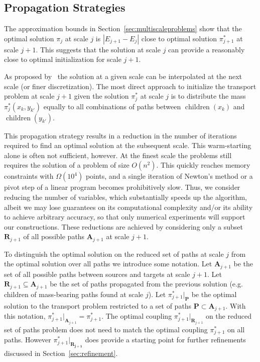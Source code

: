 \documentclass[twoside,11pt]{article}
\newcommand{\children}[0]{\operatorname{children}}
\newcommand{\coupling}[0]{\pi}
\begin{document}
\subsection{Propagation Strategies}
\label{sec:propagation}
The approximation bounds in Section~\ref{sec:multiscaleproblems} show that the
optimal solution $\coupling_{j}$ at scale $j$ is $| E_{j+1} - E_j |$ close to
optimal solution $\coupling_{j+1}^*$ at scale $j+1$. This suggests that the
solution at scale $j$ can provide a reasonably close to optimal initialization
for scale $j+1$.  

As proposed by~\citet{glimm:arxiv2011} the solution at a given scale can be
interpolated at the next scale (or finer discretization).  The most direct
approach to initialize the transport problem at scale $j+1$ given the solution
$\coupling_{j}^*$ at scale $j$ is to distribute the mass $\coupling_{j}^*(x_k,
y_{k'})$ equally to all combinations of paths between $\children(x_k)$ and
$\children(y_{k'})$.  

This propagation strategy results in a reduction in the number of iterations
required to find an optimal solution at the subsequent scale.  This
warm-starting alone is often not sufficient, however. At the finest scale the
problems still requires the solution of a problem of size $O(n^2)$. This
quickly reaches memory constraints with $\Omega(10^4)$ points, and a single
iteration of Newton's method or a pivot step of a linear program becomes
prohibitively slow. Thus, we consider reducing the number of variables, which
substantially speeds up the algorithm, albeit we may lose guarantees on its
computational complexity and/or its ability to achieve arbitrary accuracy, so
that only numerical experiments will support our constructions.  These
reductions are achieved by considering only a subset $\mathbf{R}_{j+1}$ of all
possible paths $\mathbf{A}_{j+1}$ at scale $j+1$.

To distinguish the optimal solution on the reduced set of paths at scale $j$
from the optimal solution over all paths we introduce some notation. Let
$\mathbf{A}_{j+1}$ be the set of all possible paths between sources and targets
at scale $j+1$. Let $\mathbf{R}_{j+1} \subseteq \mathbf{A}_{j+1}$ be the set of
paths propagated from the previous solution (e.g. children of mass-bearing
paths found at scale $j$).  Let $\coupling^*_{j+1}  |_{\mathbf{P}}$ be the
optimal solution to the transport problem restricted to a set of paths
$\mathbf{P} \subset \mathbf{A}_{j+1}$.  With this notation, $ \coupling_{j+1}^*
|_{\mathbf{A}_{j+1}} = \coupling_{j+1}^*$.  The optimal coupling
$\coupling_{j+1}^*|_{\mathbf{R}_{j+1}}$ on the reduced set of paths problem does
not need to match the optimal coupling $\coupling_{j+1}^*$ on all paths.
However $ \coupling_{j+1}^* |_\mathbf{R_{j+1}}$ does provide a starting point
for further refinements discussed in Section~\ref{sec:refinement}.
\end{document}
